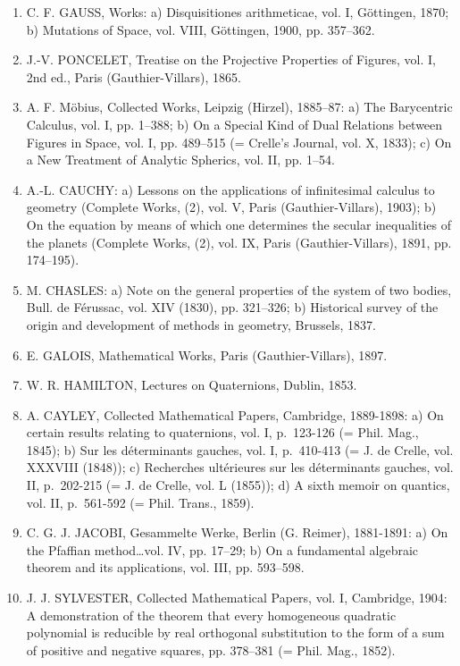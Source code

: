 \begin{enumerate}
  G. MONGE, Descriptive Geometry, Paris, 1798.
\item
  C. F. GAUSS, Works: a) Disquisitiones arithmeticae, vol. I, Göttingen, 1870; b) Mutations of Space, vol. VIII, Göttingen, 1900, pp. 357–362.
\item
  J.-V. PONCELET, Treatise on the Projective Properties of Figures, vol. I, 2nd ed., Paris (Gauthier-Villars), 1865.
\item
  A. F. Möbius, Collected Works, Leipzig (Hirzel), 1885–87: a) The Barycentric Calculus, vol. I, pp. 1–388; b) On a Special Kind of Dual Relations between Figures in Space, vol. I, pp. 489–515 (= Crelle's Journal, vol. X, 1833); c) On a New Treatment of Analytic Spherics, vol. II, pp. 1–54.
\item
  A.-L. CAUCHY: a) Lessons on the applications of infinitesimal calculus to geometry (Complete Works, (2), vol. V, Paris (Gauthier-Villars), 1903); b) On the equation by means of which one determines the secular inequalities of the planets (Complete Works, (2), vol. IX, Paris (Gauthier-Villars), 1891, pp. 174–195).
\item
  M. CHASLES: a) Note on the general properties of the system of two bodies, Bull. de Férussac, vol. XIV (1830), pp. 321–326; b) Historical survey of the origin and development of methods in geometry, Brussels, 1837.
\item
  E. GALOIS, Mathematical Works, Paris (Gauthier-Villars), 1897.
\item
  W. R. HAMILTON, Lectures on Quaternions, Dublin, 1853.
\item
  A. CAYLEY, Collected Mathematical Papers, Cambridge, 1889-1898: a) On certain results relating to quaternions, vol. I, p.~123-126 (= Phil. Mag., 1845); b) Sur les déterminants gauches, vol. I, p.~410-413 (= J. de Crelle, vol. XXXVIII (1848)); c) Recherches ultérieures sur les déterminants gauches, vol. II, p.~202-215 (= J. de Crelle, vol. L (1855)); d) A sixth memoir on quantics, vol. II, p.~561-592 (= Phil. Trans., 1859).
\item
  C. G. J. JACOBI, Gesammelte Werke, Berlin (G. Reimer), 1881-1891: a) On the Pfaffian method\ldots vol. IV, pp. 17–29; b) On a fundamental algebraic theorem and its applications, vol. III, pp. 593–598.
\item
  J. J. SYLVESTER, Collected Mathematical Papers, vol. I, Cambridge, 1904: A demonstration of the theorem that every homogeneous quadratic polynomial is reducible by real orthogonal substitution to the form of a sum of positive and negative squares, pp. 378–381 (= Phil. Mag., 1852).

\end{enumerate}
